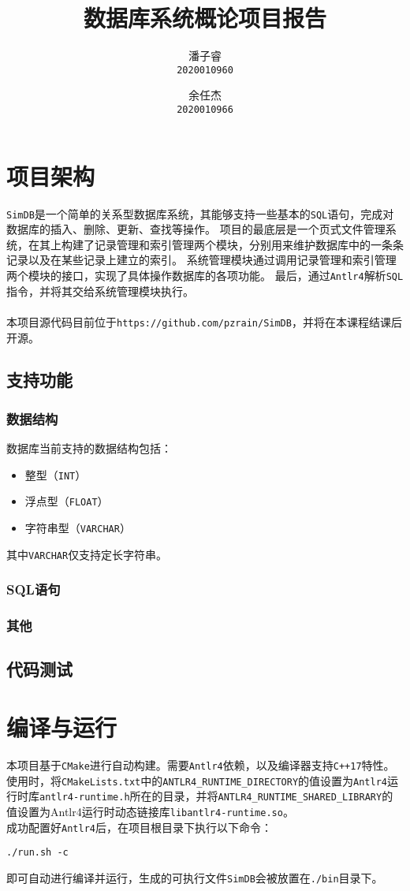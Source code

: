 \documentclass[11pt]{article}
\title{\textbf{数据库系统概论项目报告}}
\author{
    潘子睿\\
    \texttt{2020010960}
    \and
    余任杰\\
    \texttt{2020010966}
}
\begin{document}
\maketitle
\tableofcontents
\setlength{\parindent}{0pt}
\clearpage

\section{项目架构}
\texttt{SimDB}是一个简单的关系型数据库系统，其能够支持一些基本的\texttt{SQL}语句，完成对数据库的插入、删除、更新、查找等操作。
项目的最底层是一个页式文件管理系统，在其上构建了记录管理和索引管理两个模块，分别用来维护数据库中的一条条记录以及在某些记录上建立的索引。
系统管理模块通过调用记录管理和索引管理两个模块的接口，实现了具体操作数据库的各项功能。
最后，通过\texttt{Antlr4}解析\texttt{SQL}指令，并将其交给系统管理模块执行。\\\\
本项目源代码目前位于\texttt{https://github.com/pzrain/SimDB}，并将在本课程结课后开源。
\subsection{支持功能}
\subsubsection{数据结构}
数据库当前支持的数据结构包括：
\begin{itemize}
    \item 整型（\texttt{INT}）
    \item 浮点型（\texttt{FLOAT}）
    \item 字符串型（\texttt{VARCHAR}）
\end{itemize}
其中\texttt{VARCHAR}仅支持定长字符串。
\subsubsection{SQL语句}
\subsubsection{其他}
\subsection{代码测试}

\section{编译与运行}
本项目基于\texttt{CMake}进行自动构建。需要\texttt{Antlr4}依赖，以及编译器支持\texttt{C++17}特性。
使用时，将\texttt{CMakeLists.txt}中的\texttt{ANTLR4\_RUNTIME\_DIRECTORY}的值设置为\texttt{Antlr4}运行时库\texttt{antlr4-runtime.h}所在的目录，并将\texttt{ANTLR4\_RUNTIME\_SHARED\_LIBRARY}的值设置为Antlr4运行时动态链接库\texttt{libantlr4-runtime.so}。\\
成功配置好\texttt{Antlr4}后，在项目根目录下执行以下命令：
\begin{verbatim}
./run.sh -c
\end{verbatim}
即可自动进行编译并运行，生成的可执行文件\texttt{SimDB}会被放置在\texttt{./bin}目录下。
\end{document}
